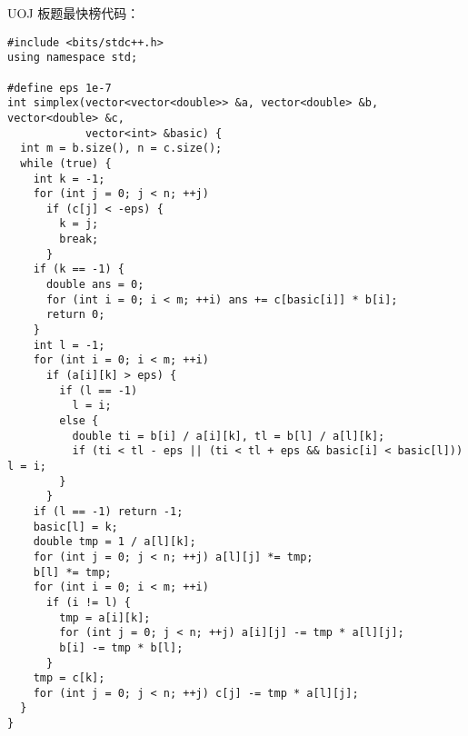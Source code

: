 UOJ 板题最快榜代码：
\begin{lstlisting}
#include <bits/stdc++.h>
using namespace std;

#define eps 1e-7
int simplex(vector<vector<double>> &a, vector<double> &b, vector<double> &c,
            vector<int> &basic) {
  int m = b.size(), n = c.size();
  while (true) {
    int k = -1;
    for (int j = 0; j < n; ++j)
      if (c[j] < -eps) {
        k = j;
        break;
      }
    if (k == -1) {
      double ans = 0;
      for (int i = 0; i < m; ++i) ans += c[basic[i]] * b[i];
      return 0;
    }
    int l = -1;
    for (int i = 0; i < m; ++i)
      if (a[i][k] > eps) {
        if (l == -1)
          l = i;
        else {
          double ti = b[i] / a[i][k], tl = b[l] / a[l][k];
          if (ti < tl - eps || (ti < tl + eps && basic[i] < basic[l])) l = i;
        }
      }
    if (l == -1) return -1;
    basic[l] = k;
    double tmp = 1 / a[l][k];
    for (int j = 0; j < n; ++j) a[l][j] *= tmp;
    b[l] *= tmp;
    for (int i = 0; i < m; ++i)
      if (i != l) {
        tmp = a[i][k];
        for (int j = 0; j < n; ++j) a[i][j] -= tmp * a[l][j];
        b[i] -= tmp * b[l];
      }
    tmp = c[k];
    for (int j = 0; j < n; ++j) c[j] -= tmp * a[l][j];
  }
}


\end{lstlisting}
